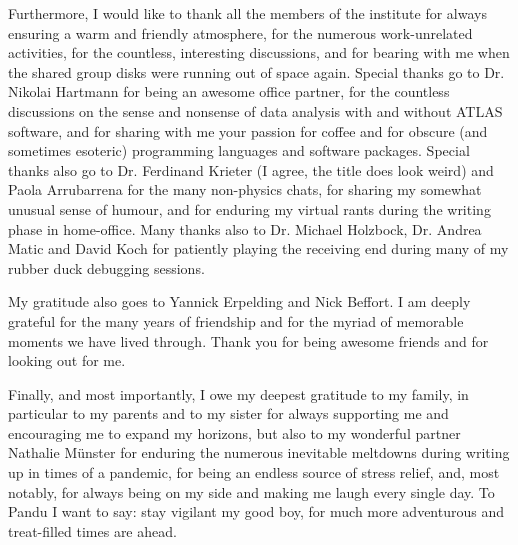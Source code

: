 \begin{acknowledgements}[Acknowledgements]
Furthermore, I would like to thank all the members of the institute for always ensuring a warm and friendly atmosphere, for the numerous work-unrelated activities, for the countless, interesting discussions, and for bearing with me when the shared group disks were running out of space again.
Special thanks go to Dr.\@\xspace Nikolai Hartmann for being an awesome office partner, for the countless discussions on the sense and nonsense of data analysis with and without ATLAS software, and for sharing with me your passion for coffee and for obscure (and sometimes esoteric) programming languages and software packages.
Special thanks also go to Dr.\@\xspace Ferdinand Krieter (I agree, the title does look weird) and Paola Arrubarrena for the many non-physics chats, for sharing my somewhat unusual sense of humour, and for enduring my virtual rants during the writing phase in home-office.
Many thanks also to Dr.\@\xspace Michael Holzbock, Dr.\@\xspace Andrea Matic and David Koch for patiently playing the receiving end during many of my rubber duck debugging sessions. 

My gratitude also goes to Yannick Erpelding and Nick Beffort. I am deeply grateful for the many years of friendship and for the myriad of memorable moments we have lived through. Thank you for being awesome friends and for looking out for me.

Finally, and most importantly, I owe my deepest gratitude to my family, in particular to my parents and to my sister for always supporting me and encouraging me to expand my horizons, but also to my wonderful partner Nathalie M\"unster for enduring the numerous inevitable meltdowns during writing up in times of a pandemic, for being an endless source of stress relief, and, most notably, for always being on my side and making me laugh every single day. To Pandu I want to say: stay vigilant my good boy, for much more adventurous and treat-filled times are ahead.  
\end{acknowledgements}
